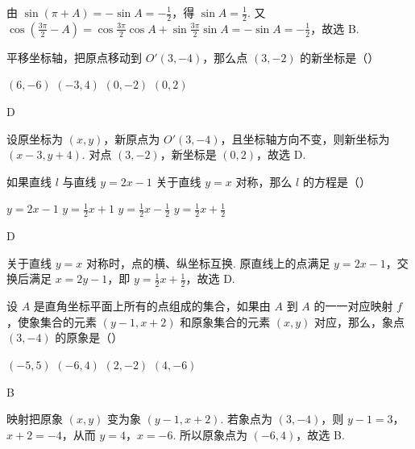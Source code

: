 \documentclass[UTF8,a4paper,oneside,11pt]{ctexbook}
\begin{document}
\begin{solution}
由 \(\sin(\pi+A)=-\sin A=-\frac12\)，得 \(\sin A=\frac12\). 又
\(\cos\left(\frac{3\pi}{2}-A\right)=\cos\frac{3\pi}{2}\cos A+\sin\frac{3\pi}{2}\sin A=-\sin A=-\frac12\)，故选 B.
\end{solution}

\begin{problem}
平移坐标轴，把原点移动到 \(O'(3,-4)\)，那么点 \((3,-2)\) 的新坐标是（\quad）

\choices
    {\((6,-6)\)}
    {\((-3,4)\)}
    {\((0,-2)\)}
    {\((0,2)\)}
\end{problem}

\begin{answer}
D
\end{answer}

\begin{solution}
设原坐标为 \((x,y)\)，新原点为 \(O'(3,-4)\)，且坐标轴方向不变，则新坐标为 \((x-3,y+4)\). 对点 \((3,-2)\)，新坐标是 \((0,2)\)，故选 D.
\end{solution}

\begin{problem}
如果直线 \(l\) 与直线 \(y=2x-1\) 关于直线 \(y=x\) 对称，那么 \(l\) 的方程是（\quad）

\choices
    {\(y=2x-1\)}
    {\(y=\frac{1}{2}x+1\)}
    {\(y=\frac{1}{2}x-\frac{1}{2}\)}
    {\(y=\frac{1}{2}x+\frac{1}{2}\)}
\end{problem}

\begin{answer}
D
\end{answer}

\begin{solution}
关于直线 \(y=x\) 对称时，点的横、纵坐标互换. 原直线上的点满足 \(y=2x-1\)，交换后满足 \(x=2y-1\)，即 \(y=\frac12x+\frac12\)，故选 D.
\end{solution}

\begin{problem}
设 \(A\) 是直角坐标平面上所有的点组成的集合，如果由 \(A\) 到 \(A\) 的一一对应映射 \(f\)，使象集合的元素 \((y-1,x+2)\) 和原象集合的元素 \((x,y)\) 对应，那么，象点 \((3,-4)\) 的原象是（\quad）

\choices
    {\((-5,5)\)}
    {\((-6,4)\)}
    {\((2,-2)\)}
    {\((4,-6)\)}
\end{problem}

\begin{answer}
B
\end{answer}

\begin{solution}
映射把原象 \((x,y)\) 变为象 \((y-1,x+2)\). 若象点为 \((3,-4)\)，则
\(y-1=3\)，\(x+2=-4\)，从而 \(y=4\)，\(x=-6\). 所以原象点为 \((-6,4)\)，故选 B.
\end{solution}
\end{document}
